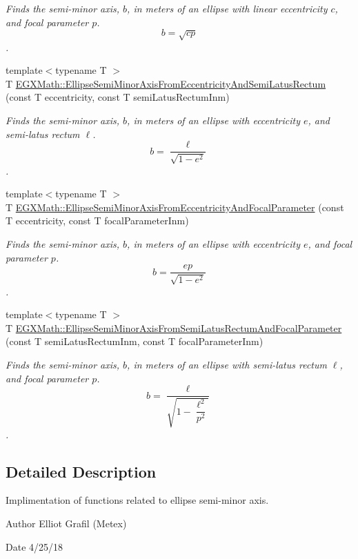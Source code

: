 \begin{DoxyCompactItemize}
\begin{DoxyCompactList}\small\item\em Finds the semi-\/minor axis, $b$, in meters of an ellipse with linear eccentricity $c$, and focal parameter $p$. \[ b=\sqrt{c p} \]. \end{DoxyCompactList}\item 
{\footnotesize template$<$typename T $>$ }\\T \mbox{\hyperlink{group___e_g_x_math-_geometry-2_d-_ellipse-_semi_minor_axis_ga1194f5481c66c492147a27b9e167df4f}{E\+G\+X\+Math\+::\+Ellipse\+Semi\+Minor\+Axis\+From\+Eccentricity\+And\+Semi\+Latus\+Rectum}} (const T eccentricity, const T semi\+Latus\+Rectum\+Inm)
\begin{DoxyCompactList}\small\item\em Finds the semi-\/minor axis, $b$, in meters of an ellipse with eccentricity $e$, and semi-\/latus rectum $\ell$. \[ b=\dfrac{\ell}{\sqrt{1 - e^2}} \]. \end{DoxyCompactList}\item 
{\footnotesize template$<$typename T $>$ }\\T \mbox{\hyperlink{group___e_g_x_math-_geometry-2_d-_ellipse-_semi_minor_axis_ga7bfc286b245acfcfd6c6bce85d25cdbb}{E\+G\+X\+Math\+::\+Ellipse\+Semi\+Minor\+Axis\+From\+Eccentricity\+And\+Focal\+Parameter}} (const T eccentricity, const T focal\+Parameter\+Inm)
\begin{DoxyCompactList}\small\item\em Finds the semi-\/minor axis, $b$, in meters of an ellipse with eccentricity $e$, and focal parameter $p$. \[ b=\dfrac{ep}{\sqrt{1 - e^2}} \]. \end{DoxyCompactList}\item 
{\footnotesize template$<$typename T $>$ }\\T \mbox{\hyperlink{group___e_g_x_math-_geometry-2_d-_ellipse-_semi_minor_axis_gafe27ed64ba521ec3cf8557520cbc6a14}{E\+G\+X\+Math\+::\+Ellipse\+Semi\+Minor\+Axis\+From\+Semi\+Latus\+Rectum\+And\+Focal\+Parameter}} (const T semi\+Latus\+Rectum\+Inm, const T focal\+Parameter\+Inm)
\begin{DoxyCompactList}\small\item\em Finds the semi-\/minor axis, $b$, in meters of an ellipse with semi-\/latus rectum $\ell$, and focal parameter $p$. \[ b=\dfrac{\ell}{\sqrt{1-\dfrac{\ell^2}{p^2}}} \]. \end{DoxyCompactList}\end{DoxyCompactItemize}


\subsection{Detailed Description}
Implimentation of functions related to ellipse semi-\/minor axis. 

\begin{DoxyAuthor}{Author}
Elliot Grafil (Metex) 
\end{DoxyAuthor}
\begin{DoxyDate}{Date}
4/25/18 
\end{DoxyDate}
